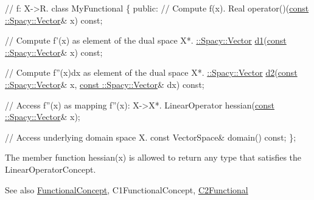 \begin{DoxyCode}
\textcolor{comment}{// f: X->R.}
\textcolor{keyword}{class }MyFunctional
\{
\textcolor{keyword}{public}:
  \textcolor{comment}{// Compute f(x).}
  Real operator()(\hyperlink{group__VectorSpaceGroup_gafda42fd5aa3f7597a42b9831bf4dfd07}{const ::Spacy::Vector}& x) \textcolor{keyword}{const};

  \textcolor{comment}{// Compute f'(x) as element of the dual space X*.}
  \hyperlink{classSpacy_1_1Vector}{::Spacy::Vector} \hyperlink{namespaceSpacy_ab6646eb7068eb9f1369e639cf0b620a2}{d1}(\hyperlink{group__VectorSpaceGroup_gafda42fd5aa3f7597a42b9831bf4dfd07}{const ::Spacy::Vector}& x) \textcolor{keyword}{const};

  \textcolor{comment}{// Compute f''(x)dx as element of the dual space X*.}
  \hyperlink{classSpacy_1_1Vector}{::Spacy::Vector} \hyperlink{namespaceSpacy_a569d8fc0b4a0e292f257dd6307a25c8f}{d2}(\hyperlink{group__VectorSpaceGroup_gafda42fd5aa3f7597a42b9831bf4dfd07}{const ::Spacy::Vector}& x, 
      \hyperlink{group__VectorSpaceGroup_gafda42fd5aa3f7597a42b9831bf4dfd07}{const ::Spacy::Vector}& dx) \textcolor{keyword}{const};

  \textcolor{comment}{// Access f''(x) as mapping f''(x): X->X*.}
  LinearOperator hessian(\hyperlink{group__VectorSpaceGroup_gafda42fd5aa3f7597a42b9831bf4dfd07}{const ::Spacy::Vector}& x);

  \textcolor{comment}{// Access underlying domain space X.}
  \textcolor{keyword}{const} VectorSpace& domain() \textcolor{keyword}{const};
\};
\end{DoxyCode}


The member function {\ttfamily hessian(x)} is allowed to return any type that satisfies the Linear\+Operator\+Concept.

\begin{DoxySeeAlso}{See also}
\hyperlink{group__ConceptGroup_gae45328d2e01ef6c8e5d948b69fda385f}{Functional\+Concept}, C1\+Functional\+Concept, \hyperlink{classSpacy_1_1C2Functional}{C2\+Functional} 
\end{DoxySeeAlso}
\hypertarget{group__ConceptGroup_ga5a296e4942cbfeba1e8538594a6e9c26}{}
